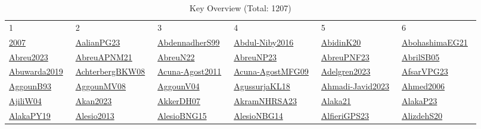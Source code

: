 \begin{longtable}{*{6}{l}}
\rowcolor{white}\caption{Key Overview (Total: 1207)}\\ \toprule
\rowcolor{white}1 & 2 & 3 & 4 & 5 & 6\\ \midrule
\endhead
\bottomrule
\endfoot
\href{../}{2007}~\cite{2007} & \href{../works/AalianPG23.pdf}{AalianPG23}~\cite{AalianPG23} & \href{../works/AbdennadherS99.pdf}{AbdennadherS99}~\cite{AbdennadherS99} & \href{../works/Abdul-Niby2016.pdf}{Abdul-Niby2016}~\cite{Abdul-Niby2016} & \href{../works/AbidinK20.pdf}{AbidinK20}~\cite{AbidinK20} & \href{../works/AbohashimaEG21.pdf}{AbohashimaEG21}~\cite{AbohashimaEG21}\\ 
\href{../works/Abreu2023.pdf}{Abreu2023}~\cite{Abreu2023} & \href{../works/AbreuAPNM21.pdf}{AbreuAPNM21}~\cite{AbreuAPNM21} & \href{../works/AbreuN22.pdf}{AbreuN22}~\cite{AbreuN22} & \href{../works/AbreuNP23.pdf}{AbreuNP23}~\cite{AbreuNP23} & \href{../works/AbreuPNF23.pdf}{AbreuPNF23}~\cite{AbreuPNF23} & \href{../works/AbrilSB05.pdf}{AbrilSB05}~\cite{AbrilSB05}\\ 
\href{../}{Abuwarda2019}~\cite{Abuwarda2019} & \href{../works/AchterbergBKW08.pdf}{AchterbergBKW08}~\cite{AchterbergBKW08} & \href{../works/Acuna-Agost2011.pdf}{Acuna-Agost2011}~\cite{Acuna-Agost2011} & \href{../works/Acuna-AgostMFG09.pdf}{Acuna-AgostMFG09}~\cite{Acuna-AgostMFG09} & \href{../works/Adelgren2023.pdf}{Adelgren2023}~\cite{Adelgren2023} & \href{../works/AfsarVPG23.pdf}{AfsarVPG23}~\cite{AfsarVPG23}\\ 
\href{../works/AggounB93.pdf}{AggounB93}~\cite{AggounB93} & \href{../}{AggounMV08}~\cite{AggounMV08} & \href{../}{AggounV04}~\cite{AggounV04} & \href{../works/AgussurjaKL18.pdf}{AgussurjaKL18}~\cite{AgussurjaKL18} & \href{../}{Ahmadi-Javid2023}~\cite{Ahmadi-Javid2023} & \href{../works/Ahmed2006.pdf}{Ahmed2006}~\cite{Ahmed2006}\\ 
\href{../}{AjiliW04}~\cite{AjiliW04} & \href{../works/Akan2023.pdf}{Akan2023}~\cite{Akan2023} & \href{../works/AkkerDH07.pdf}{AkkerDH07}~\cite{AkkerDH07} & \href{../works/AkramNHRSA23.pdf}{AkramNHRSA23}~\cite{AkramNHRSA23} & \href{../works/Alaka21.pdf}{Alaka21}~\cite{Alaka21} & \href{../works/AlakaP23.pdf}{AlakaP23}~\cite{AlakaP23}\\ 
\href{../works/AlakaPY19.pdf}{AlakaPY19}~\cite{AlakaPY19} & \href{../works/Alesio2013.pdf}{Alesio2013}~\cite{Alesio2013} & \href{../works/AlesioBNG15.pdf}{AlesioBNG15}~\cite{AlesioBNG15} & \href{../works/AlesioNBG14.pdf}{AlesioNBG14}~\cite{AlesioNBG14} & \href{../works/AlfieriGPS23.pdf}{AlfieriGPS23}~\cite{AlfieriGPS23} & \href{../}{AlizdehS20}~\cite{AlizdehS20}\\ 

\end{longtable}
